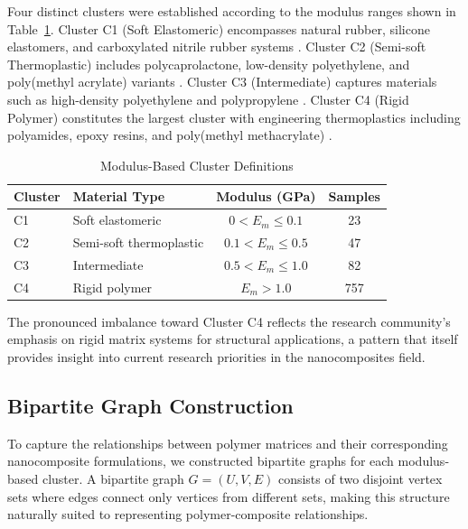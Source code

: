\documentclass[conference]{IEEEtran}
\begin{document}
Four distinct clusters were established according to the modulus ranges shown in Table~\ref{tab:clusters}. Cluster C1 (Soft Elastomeric) encompasses natural rubber, silicone elastomers, and carboxylated nitrile rubber systems \cite{5, 109}. Cluster C2 (Semi-soft Thermoplastic) includes polycaprolactone, low-density polyethylene, and poly(methyl acrylate) variants \cite{6, 1, 16}. Cluster C3 (Intermediate) captures materials such as high-density polyethylene and polypropylene \cite{77, 94, 122, 131}. Cluster C4 (Rigid Polymer) constitutes the largest cluster with engineering thermoplastics including polyamides, epoxy resins, and poly(methyl methacrylate) \cite{80, 92, 87}.

\begin{table}[htbp]
\caption{Modulus-Based Cluster Definitions}
\begin{center}
\begin{tabular}{@{}llcc@{}}
\toprule
Cluster & Material Type & Modulus (GPa) & Samples \\
\midrule
C1 & Soft elastomeric & $0 < E_m \leq 0.1$ & 23 \\
C2 & Semi-soft thermoplastic & $0.1 < E_m \leq 0.5$ & 47 \\
C3 & Intermediate & $0.5 < E_m \leq 1.0$ & 82 \\
C4 & Rigid polymer & $E_m > 1.0$ & 757 \\
\bottomrule
\end{tabular}
\label{tab:clusters}
\end{center}
\end{table}

The pronounced imbalance toward Cluster C4 reflects the research community's emphasis on rigid matrix systems for structural applications, a pattern that itself provides insight into current research priorities in the nanocomposites field.

\subsection{Bipartite Graph Construction}

To capture the relationships between polymer matrices and their corresponding nanocomposite formulations, we constructed bipartite graphs for each modulus-based cluster. A bipartite graph $G = (U, V, E)$ consists of two disjoint vertex sets where edges connect only vertices from different sets, making this structure naturally suited to representing polymer-composite relationships.
\end{document}
